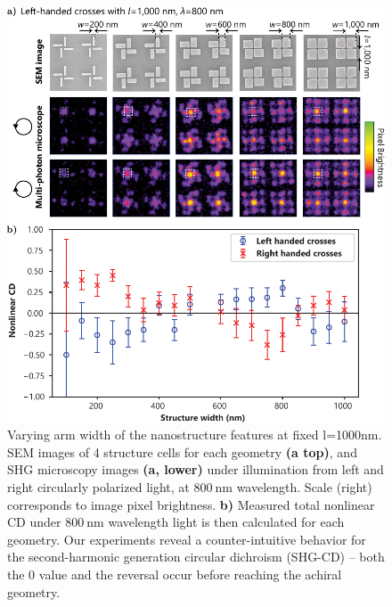 \begin{figure}[htb!]	
    \centering	
    \includegraphics[scale=1]{./figures/results/EnantiomorphingChiralCrosses/l1000data.pdf}
    \caption{\label{fig:results:EnantiomorphingChiralCrosses:l1000data}
    Varying arm width of the nanostructure features at fixed l=1000nm. SEM images of 4 structure cells for each geometry \textbf{(a top)}, and SHG microscopy images \textbf{(a, lower)} under illumination from left and right circularly polarized light, at $\SI{800}{\nano\m}$ wavelength. Scale (right) corresponds to image pixel brightness. \textbf{b)} Measured total nonlinear CD under $\SI{800}{\nano\m}$ wavelength light is then calculated for each geometry. Our experiments reveal a counter-intuitive behavior for the second-harmonic generation circular dichroism (SHG-CD) – both the 0 value and the reversal occur before reaching the achiral geometry.}	
\end{figure}

